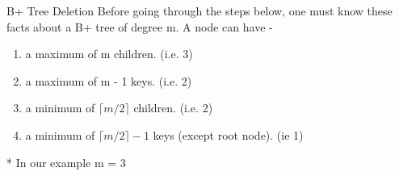 \documentclass{beamer}
\begin{document}
\begin{frame}{B+ Tree Deletion}
    Before going through the steps below, one must know these facts about a B+ tree of degree m. A node can have -
    \begin{enumerate}
        \item a maximum of m children. (i.e. 3)
        \item a maximum of m - 1 keys. (i.e. 2)
        \item a minimum of $\lceil m/2 \rceil$ children. (i.e. 2)
        \item a minimum of $\lceil m/2 \rceil - 1$ keys (except root node). (ie 1) \end{enumerate} \vspace{20pt}* In our example m = 3
\end{frame}
\end{document}
